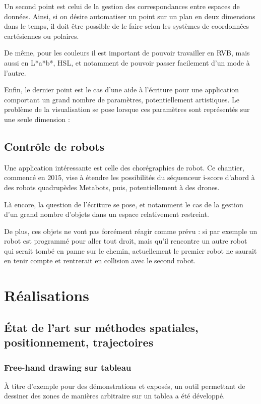 \documentclass[french]{article}
\begin{document}
Un second point est celui de la gestion des correspondances entre espaces de données. Ainsi, si on désire automatiser un point sur un plan en deux dimensions dans le temps, il doit être possible de le faire selon les systèmes de coordonnées cartésiennes ou polaires.

De même, pour les couleurs il est important de pouvoir travailler en RVB, mais aussi en L*a*b*, HSL, et notamment de pouvoir passer facilement d'un mode à l'autre.

Enfin, le dernier point est le cas d'une aide à l'écriture pour une application comportant un grand nombre de paramètres, potentiellement artistiques. Le problème de la visualisation se pose lorsque ces paramètres sont représentés sur une seule dimension : %

\subsection{Contrôle de robots}
Une application intéressante est celle des chorégraphies de robot. Ce chantier, commencé en 2015, vise à étendre les possibilités du séquenceur i-score d'abord à des robots quadrupèdes Metabots, puis, potentiellement à des drones.

Là encore, la question de l'écriture se pose, et notamment le cas de la gestion d'un grand nombre d'objets dans un espace relativement restreint.

De plus, ces objets ne vont pas forcément réagir comme prévu : si par exemple un robot est programmé pour aller tout droit, mais qu'il rencontre un autre robot qui serait tombé en panne sur le chemin, actuellement le premier robot ne saurait en tenir compte et rentrerait en collision avec le second robot.


\section{Réalisations}
\subsection{État de l'art sur méthodes spatiales, positionnement, trajectoires}

\subsubsection{Free-hand drawing sur tableau}
À titre d'exemple pour des démonstrations et exposés, un outil permettant de dessiner des zones de manières arbitraire sur un tablea a été développé. %
\end{document}

